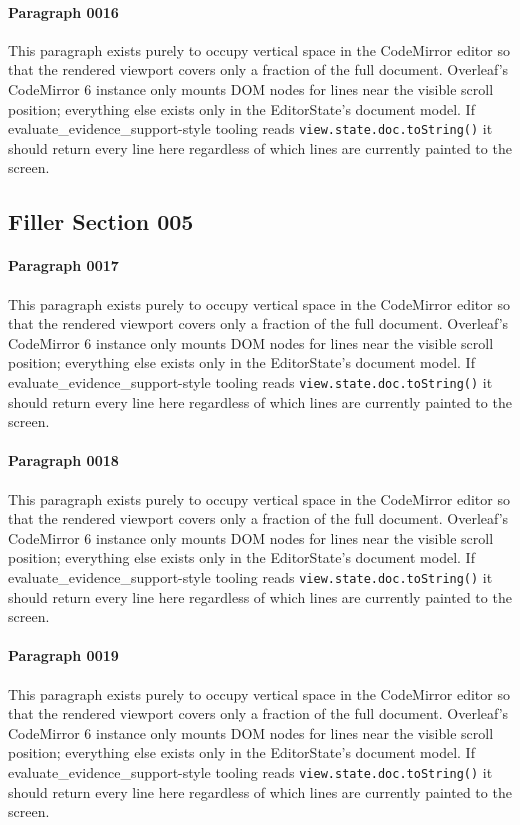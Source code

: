 \documentclass{article}
\begin{document}
\paragraph{Paragraph 0016}
This paragraph exists purely to occupy vertical space in the CodeMirror editor so that the rendered viewport covers only a fraction of the full document. Overleaf's CodeMirror 6 instance only mounts DOM nodes for lines near the visible scroll position; everything else exists only in the EditorState's document model. If evaluate\_evidence\_support-style tooling reads \texttt{view.state.doc.toString()} it should return every line here regardless of which lines are currently painted to the screen.

\subsection{Filler Section 005}
\paragraph{Paragraph 0017}
This paragraph exists purely to occupy vertical space in the CodeMirror editor so that the rendered viewport covers only a fraction of the full document. Overleaf's CodeMirror 6 instance only mounts DOM nodes for lines near the visible scroll position; everything else exists only in the EditorState's document model. If evaluate\_evidence\_support-style tooling reads \texttt{view.state.doc.toString()} it should return every line here regardless of which lines are currently painted to the screen.

\paragraph{Paragraph 0018}
This paragraph exists purely to occupy vertical space in the CodeMirror editor so that the rendered viewport covers only a fraction of the full document. Overleaf's CodeMirror 6 instance only mounts DOM nodes for lines near the visible scroll position; everything else exists only in the EditorState's document model. If evaluate\_evidence\_support-style tooling reads \texttt{view.state.doc.toString()} it should return every line here regardless of which lines are currently painted to the screen.

\paragraph{Paragraph 0019}
This paragraph exists purely to occupy vertical space in the CodeMirror editor so that the rendered viewport covers only a fraction of the full document. Overleaf's CodeMirror 6 instance only mounts DOM nodes for lines near the visible scroll position; everything else exists only in the EditorState's document model. If evaluate\_evidence\_support-style tooling reads \texttt{view.state.doc.toString()} it should return every line here regardless of which lines are currently painted to the screen.
\end{document}
